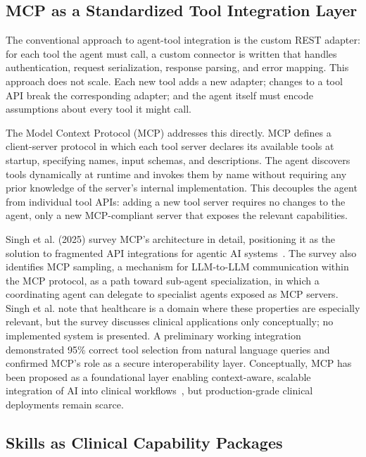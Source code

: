 \documentclass[conference]{IEEEtran}
\begin{document}
\subsection{MCP as a Standardized Tool Integration Layer}

The conventional approach to agent-tool integration is the custom REST adapter: for each tool the agent must call, a custom connector is written that handles authentication, request serialization, response parsing, and error mapping. This approach does not scale. Each new tool adds a new adapter; changes to a tool API break the corresponding adapter; and the agent itself must encode assumptions about every tool it might call.

The Model Context Protocol (MCP) addresses this directly. MCP defines a client-server protocol in which each tool server declares its available tools at startup, specifying names, input schemas, and descriptions. The agent discovers tools dynamically at runtime and invokes them by name without requiring any prior knowledge of the server's internal implementation. This decouples the agent from individual tool APIs: adding a new tool server requires no changes to the agent, only a new MCP-compliant server that exposes the relevant capabilities.

Singh et al. (2025) survey MCP's architecture in detail, positioning it as the solution to fragmented API integrations for agentic AI systems~\cite{mcp-aditi}. The survey also identifies MCP sampling, a mechanism for LLM-to-LLM communication within the MCP protocol, as a path toward sub-agent specialization, in which a coordinating agent can delegate to specialist agents exposed as MCP servers. Singh et al. note that healthcare is a domain where these properties are especially relevant, but the survey discusses clinical applications only conceptually; no implemented system is presented. A preliminary working integration~\cite{mcphosts2025} demonstrated 95\% correct tool selection from natural language queries and confirmed MCP's role as a secure interoperability layer. Conceptually, MCP has been proposed as a foundational layer enabling context-aware, scalable integration of AI into clinical workflows~\cite{transformingclinical2026}, but production-grade clinical deployments remain scarce.

\subsection{Skills as Clinical Capability Packages}
\end{document}

